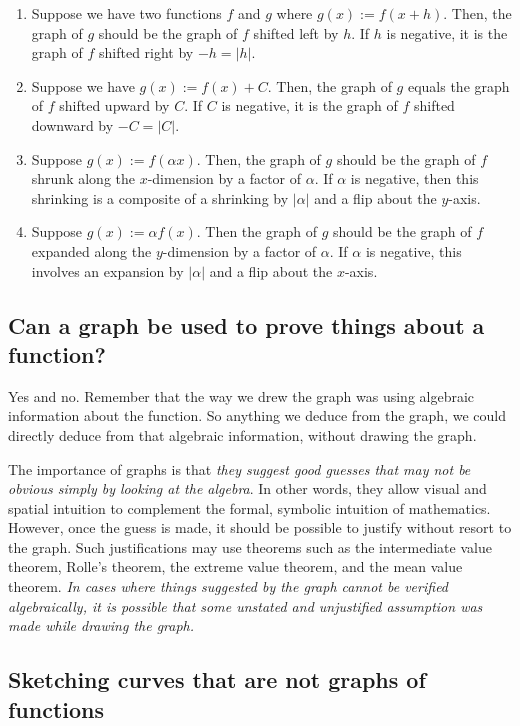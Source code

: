\documentclass[10pt]{amsart}
\begin{document}
\begin{enumerate}
\item Suppose we have two functions $f$ and $g$ where $g(x) := f(x +
  h)$. Then, the graph of $g$ should be the graph of $f$ shifted left
  by $h$. If $h$ is negative, it is the graph of $f$ shifted right by
  $-h = |h|$.
\item Suppose we have $g(x) := f(x) + C$. Then, the graph of $g$
  equals the graph of $f$ shifted upward by $C$. If $C$ is negative,
  it is the graph of $f$ shifted downward by $-C = |C|$.
\item Suppose $g(x) := f(\alpha x)$. Then, the graph of $g$ should be
  the graph of $f$ shrunk along the $x$-dimension by a factor of
  $\alpha$. If $\alpha$ is negative, then this shrinking is a
  composite of a shrinking by $|\alpha|$ and a flip about the
  $y$-axis.
\item Suppose $g(x) := \alpha f(x)$. Then the graph of $g$ should be
  the graph of $f$ expanded along the $y$-dimension by a factor of
  $\alpha$. If $\alpha$ is negative, this involves an expansion by
  $|\alpha|$ and a flip about the $x$-axis.
\end{enumerate}

\subsection{Can a graph be used to prove things about a function?}

Yes and no. Remember that the way we drew the graph was using
algebraic information about the function. So anything we deduce from
the graph, we could directly deduce from that algebraic information,
without drawing the graph.

The importance of graphs is that {\em they suggest good guesses that
may not be obvious simply by looking at the algebra}. In other words,
they allow visual and spatial intuition to complement the formal,
symbolic intuition of mathematics. However, once the guess is made, it
should be possible to justify without resort to the graph. Such
justifications may use theorems such as the intermediate value
theorem, Rolle's theorem, the extreme value theorem, and the mean
value theorem. {\em In cases where things suggested by the graph
cannot be verified algebraically, it is possible that some unstated
and unjustified assumption was made while drawing the graph.}

\subsection{Sketching curves that are not graphs of functions}
\end{document}
